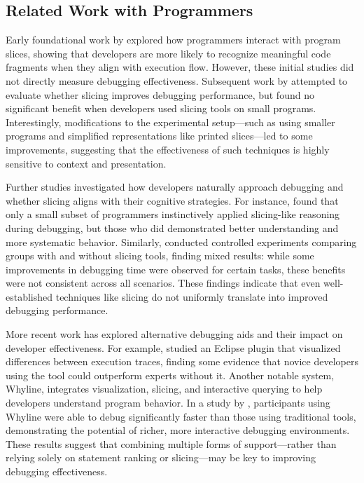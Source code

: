 \subsection{Related Work with Programmers}
Early foundational work by \cite{Weiser1981} explored how programmers interact with program slices, showing that developers are more likely to recognize meaningful code fragments when they align with execution flow. However, these initial studies did not directly measure debugging effectiveness. Subsequent work by \cite{Weiser1986} attempted to evaluate whether slicing improves debugging performance, but found no significant benefit when developers used slicing tools on small programs. Interestingly, modifications to the experimental setup—such as using smaller programs and simplified representations like printed slices—led to some improvements, suggesting that the effectiveness of such techniques is highly sensitive to context and presentation.

Further studies investigated how developers naturally approach debugging and whether slicing aligns with their cognitive strategies. For instance, \cite{Francel2001} found that only a small subset of programmers instinctively applied slicing-like reasoning during debugging, but those who did demonstrated better understanding and more systematic behavior. Similarly, \cite{Kusumoto2002} conducted controlled experiments comparing groups with and without slicing tools, finding mixed results: while some improvements in debugging time were observed for certain tasks, these benefits were not consistent across all scenarios. These findings indicate that even well-established techniques like slicing do not uniformly translate into improved debugging performance.

More recent work has explored alternative debugging aids and their impact on developer effectiveness. For example, \cite{Sherwood2008} studied an Eclipse plugin that visualized differences between execution traces, finding some evidence that novice developers using the tool could outperform experts without it. Another notable system, Whyline, integrates visualization, slicing, and interactive querying to help developers understand program behavior. In a study by \cite{Ko2009}, participants using Whyline were able to debug significantly faster than those using traditional tools, demonstrating the potential of richer, more interactive debugging environments. These results suggest that combining multiple forms of support—rather than relying solely on statement ranking or slicing—may be key to improving debugging effectiveness.

